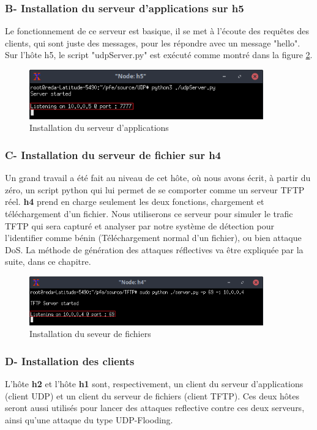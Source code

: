 \subsubsection{B- Installation du serveur d'applications sur h5}
Le fonctionnement de ce serveur est basique, il se met à l'écoute des requêtes des clients, qui sont juste des messages, pour les répondre avec un message "hello". Sur l'hôte h5, le script "udpServer.py" est exécuté comme montré dans la figure \ref{fig:udpServer}.
\begin{figure}[h]
\centering
\includegraphics[width=0.9\textwidth]{Figures/simulation/mininet/UDP/server/start}
\decoRule
\caption{Installation du serveur d'applications}
\label{fig:udpServer}
\end{figure}

\subsubsection{C- Installation du serveur de fichier sur h4}
Un grand travail a été fait au niveau de cet hôte, où nous avons écrit, à partir du zéro, un script python qui lui permet de se comporter comme un serveur TFTP réel. \textbf{h4} prend en charge seulement les deux fonctions, chargement et téléchargement d'un fichier. Nous utiliserons ce serveur pour simuler le trafic TFTP qui sera capturé et analyser par notre système de détection pour l'identifier comme bénin (Téléchargement normal d'un fichier), ou bien attaque DoS. La méthode de génération des attaques réflectives va être expliquée par la suite, dans ce chapitre.
\begin{figure}[h]
\centering
\includegraphics[width=0.9\textwidth]{Figures/simulation/mininet/TFTP/server/start}
\decoRule
\caption{Installation du seveur de fichiers}
\label{fig:udpServer}
\end{figure}

\subsubsection{D- Installation des clients}
L'hôte \textbf{h2} et l'hôte \textbf{h1} sont, respectivement, un client du serveur d'applications (client UDP) et un client du serveur de fichiers (client TFTP). Ces deux hôtes seront aussi utilisés pour lancer des attaques reflective contre ces deux serveurs, ainsi qu'une attaque du type UDP-Flooding.\\

